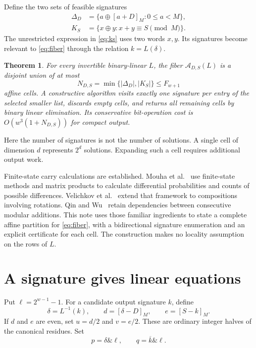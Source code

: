 \documentclass[11pt,a4paper]{article}
\newtheorem{theorem}{Theorem}
\theoremstyle{definition}\newtheorem{definition}[theorem]{Definition}
\newcommand{\andb}{\mathbin{\&}}
\newcommand{\res}[1]{[#1]_M}
\begin{document}
Define the two sets of feasible signatures
\begin{align}
\Delta_D&=\{a\oplus\res{a+D}:0\leq a<M\},\label{eq:deltas}\\
K_S&=\{x\oplus y:x+y\equiv S\pmod M\}.\label{eq:ks}
\end{align}
The unrestricted expression in \eqref{eq:ks} uses two words $x,y$.
Its signatures become relevant to \eqref{eq:fiber} through the relation
$k=L(\delta)$.

\begin{theorem}\label{thm:main}
For every invertible binary-linear $L$, the fiber
$\mathcal A_{D,S}(L)$ is a disjoint union of at most
\[
N_{D,S}=\min\{|\Delta_D|,|K_S|\}\leq F_{w+1}
\]
affine cells. A constructive algorithm visits exactly one signature per
entry of the selected smaller list, discards empty cells, and returns
all remaining cells by binary linear elimination. Its conservative
bit-operation cost is $O(w^3(1+N_{D,S}))$ for compact output.
\end{theorem}

Here the number of signatures is not the number of solutions. A single
cell of dimension $d$ represents $2^d$ solutions. Expanding such a cell
requires additional output work.

Finite-state carry calculations are established. Mouha et al.\ \cite{mouha}
use finite-state methods and matrix products to calculate differential
probabilities and counts of possible differences. Velichkov et al.\ \cite{velichkov}
extend that framework to compositions involving rotations. Qin and
Wu\ \cite{qin} retain dependencies between consecutive modular additions.
This note uses those familiar ingredients to state a complete affine
partition for \eqref{eq:fiber}, with a bidirectional signature enumeration
and an explicit certificate for each cell. The construction makes no
locality assumption on the rows of $L$.

\section{A signature gives linear equations}
Put $\ell=2^{w-1}-1$. For a candidate output signature $k$, define
\begin{equation}\label{eq:parameters}
\delta=L^{-1}(k),\qquad d=\res{\delta-D},\qquad e=\res{S-k}.
\end{equation}
If $d$ and $e$ are even, set $u=d/2$ and $v=e/2$. These are ordinary
integer halves of the canonical residues. Set
\[
p=\delta\andb\ell,\qquad q=\overline{k}\andb\ell.
\]
\end{document}
